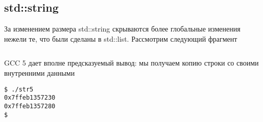 \documentclass[14pt,a4paper]{article}
\begin{document}






\subsection{std::string}

За изменением размера std::string скрываются более глобальные
изменения нежели те, что были сделаны в std::list. 
Рассмотрим следующий фрагмент
\inputminted{c++}{./src/str.cpp}

GCC 5 дает вполне предсказуемый вывод: мы получаем копию строки со
своими внутренними данными
\begin{verbatim}
$ ./str5
0x7ffeb1357230
0x7ffeb1357280
$
\end{verbatim}
\end{document}
